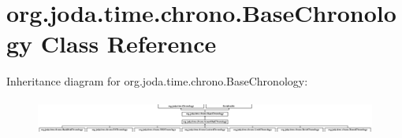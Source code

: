 \hypertarget{classorg_1_1joda_1_1time_1_1chrono_1_1_base_chronology}{\section{org.\-joda.\-time.\-chrono.\-Base\-Chronology Class Reference}
\label{classorg_1_1joda_1_1time_1_1chrono_1_1_base_chronology}
}
Inheritance diagram for org.\-joda.\-time.\-chrono.\-Base\-Chronology\-:\begin{figure}[H]
\begin{center}
\leavevmode
\includegraphics[height=1.194030cm]{classorg_1_1joda_1_1time_1_1chrono_1_1_base_chronology}
\end{center}
\end{figure}
